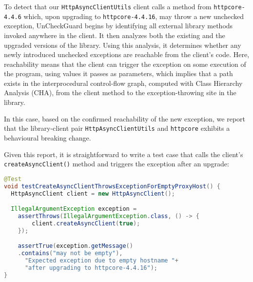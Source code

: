 To detect that our \texttt{HttpAsyncClientUtils} client calls a method from \texttt{httpcore-4.4.6} which, upon upgrading to \texttt{httpcore-4.4.16}, may throw a new unchecked exception, UnCheckGuard begins by identifying all external library methods invoked anywhere in the client. It then analyzes both the existing and the upgraded versions of the library. Using this analysis, it determines whether any newly introduced unchecked exceptions are reachable from the client's code. Here, reachability means
that the client can trigger the exception on some execution of the program, using values it passes as parameters,
which implies that a path exists in the interprocedural control-flow graph, computed with Class Hierarchy Analysis (CHA), from the client method to the exception-throwing site in the library.

In this case, based on the confirmed reachability of the new exception, we report that the library-client pair \texttt{HttpAsyncClientUtils} and \texttt{httpcore} exhibits a behavioural breaking change.

Given this report, it is straightforward to write a test case that calls the client's \texttt{createAsyncClient()} method
and triggers the exception after an upgrade:
\begin{lstlisting}[language=Java,basicstyle=\scriptsize\ttfamily]
@Test
void testCreateAsyncClientThrowsExceptionForEmptyProxyHost() {
  HttpAsyncClient client = new HttpAsyncClient();

  IllegalArgumentException exception =
    assertThrows(IllegalArgumentException.class, () -> {
        client.createAsyncClient(true);
    });

    assertTrue(exception.getMessage()
    .contains("may not be empty"),
      "Expected exception due to empty hostname "+
      "after upgrading to httpcore-4.4.16");
}
\end{lstlisting}




